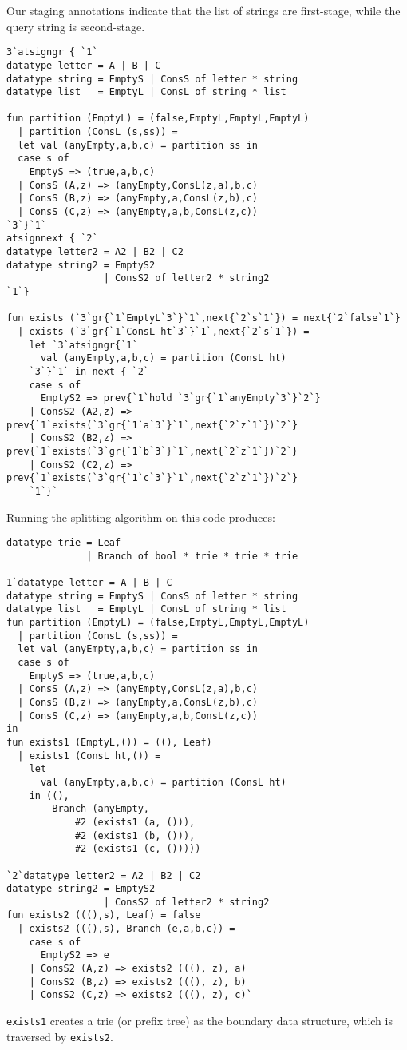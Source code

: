 Our staging annotations indicate that the list of strings are first-stage, while
the query string is second-stage.
\begin{lstlisting} 
3`atsigngr { `1`
datatype letter = A | B | C 
datatype string = EmptyS | ConsS of letter * string
datatype list   = EmptyL | ConsL of string * list

fun partition (EmptyL) = (false,EmptyL,EmptyL,EmptyL) 
  | partition (ConsL (s,ss)) = 
  let val (anyEmpty,a,b,c) = partition ss in 
  case s of 
    EmptyS => (true,a,b,c) 
  | ConsS (A,z) => (anyEmpty,ConsL(z,a),b,c) 
  | ConsS (B,z) => (anyEmpty,a,ConsL(z,b),c) 
  | ConsS (C,z) => (anyEmpty,a,b,ConsL(z,c)) 
`3`}`1`
atsignnext { `2`
datatype letter2 = A2 | B2 | C2
datatype string2 = EmptyS2 
				 | ConsS2 of letter2 * string2
`1`}

fun exists (`3`gr{`1`EmptyL`3`}`1`,next{`2`s`1`}) = next{`2`false`1`} 
  | exists (`3`gr{`1`ConsL ht`3`}`1`,next{`2`s`1`}) = 
	let `3`atsigngr{`1`
	  val (anyEmpty,a,b,c) = partition (ConsL ht)
	`3`}`1` in next { `2`
	case s of 
	  EmptyS2 => prev{`1`hold `3`gr{`1`anyEmpty`3`}`2`} 
	| ConsS2 (A2,z) => prev{`1`exists(`3`gr{`1`a`3`}`1`,next{`2`z`1`})`2`} 
	| ConsS2 (B2,z) => prev{`1`exists(`3`gr{`1`b`3`}`1`,next{`2`z`1`})`2`}
	| ConsS2 (C2,z) => prev{`1`exists(`3`gr{`1`c`3`}`1`,next{`2`z`1`})`2`}  
	`1`}` 
\end{lstlisting}
Running the splitting algorithm on this code produces:
\begin{lstlisting} 
datatype trie = Leaf 
			  | Branch of bool * trie * trie * trie

1`datatype letter = A | B | C 
datatype string = EmptyS | ConsS of letter * string
datatype list   = EmptyL | ConsL of string * list
fun partition (EmptyL) = (false,EmptyL,EmptyL,EmptyL) 
  | partition (ConsL (s,ss)) = 
  let val (anyEmpty,a,b,c) = partition ss in 
  case s of 
    EmptyS => (true,a,b,c) 
  | ConsS (A,z) => (anyEmpty,ConsL(z,a),b,c) 
  | ConsS (B,z) => (anyEmpty,a,ConsL(z,b),c) 
  | ConsS (C,z) => (anyEmpty,a,b,ConsL(z,c)) 
in
fun exists1 (EmptyL,()) = ((), Leaf)
  | exists1 (ConsL ht,()) =
	let 
	  val (anyEmpty,a,b,c) = partition (ConsL ht) 
	in ((), 
		Branch (anyEmpty, 
			#2 (exists1 (a, ())), 
			#2 (exists1 (b, ())), 
			#2 (exists1 (c, ()))))

`2`datatype letter2 = A2 | B2 | C2
datatype string2 = EmptyS2 
                 | ConsS2 of letter2 * string2
fun exists2 (((),s), Leaf) = false
  | exists2 (((),s), Branch (e,a,b,c)) = 
    case s of
	  EmptyS2 => e
	| ConsS2 (A,z) => exists2 (((), z), a)
	| ConsS2 (B,z) => exists2 (((), z), b)
	| ConsS2 (C,z) => exists2 (((), z), c)`

\end{lstlisting}

\texttt{exists1} creates a trie (or prefix tree) as the boundary data structure,
which is traversed by \texttt{exists2}.

